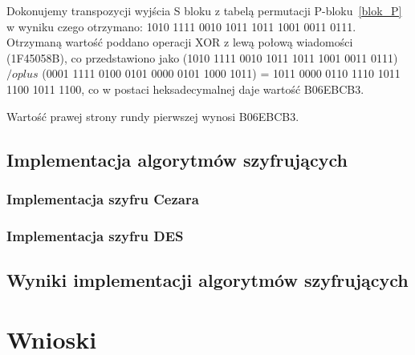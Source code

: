\documentclass[12p]{article}
\begin{document}
Dokonujemy transpozycji wyjścia S bloku z tabelą permutacji P-bloku~\ref{blok_P} w wyniku czego otrzymano: 1010 1111 0010 1011 1011 1001 0011 0111. Otrzymaną wartość poddano operacji XOR z lewą połową wiadomości (1F45058B), co przedstawiono jako (1010 1111 0010 1011 1011 1001 0011 0111) $/oplus$ (0001 1111 0100 0101 0000 0101 1000 1011) = 1011 0000 0110 1110 1011 1100 1011 1100, co w postaci heksadecymalnej daje wartość B06EBCB3.



Wartość prawej strony rundy pierwszej wynosi B06EBCB3. 

\subsection{Implementacja algorytmów szyfrujących}
\subsubsection{Implementacja szyfru Cezara}
\subsubsection{Implementacja szyfru DES}
\subsection{Wyniki implementacji algorytmów szyfrujących} 
\newpage
\section{Wnioski}
\end{document}
